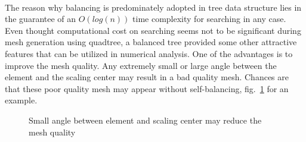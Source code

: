 \paragraph{}
The reason why balancing is predominately adopted in tree data structure lies in the guarantee of an $O\left(log(n)\right)$ time complexity for searching in any case.
Even thought computational cost on searching seems not to be significant during mesh generation using quadtree, a balanced tree provided some other attractive features that can be utilized in numerical analysis.
One of the advantages is to improve the mesh quality.
Any extremely small or large angle between the element and the scaling center may result in a bad quality mesh.
Chances are that these poor quality mesh may appear without self-balancing, fig.~\ref{qdt_fig:sbfem_adv_1} for an example.
    \begin{figure}[h!]
        \centering
        \caption{Small angle between element and scaling center may reduce the mesh quality}
        \label{qdt_fig:sbfem_adv_1}
    \end{figure}

